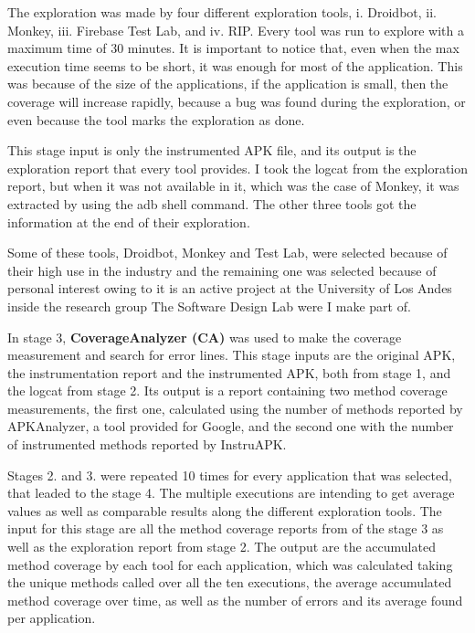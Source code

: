 The exploration was made by four different exploration tools, i. Droidbot, ii. Monkey, iii. Firebase Test Lab, and iv. RIP. Every tool was run to explore with a maximum time of 30 minutes. It is important to notice that, even when the max execution time seems to be short, it was enough for most of the application. This was because of the size of the applications, if the application is small, then the coverage will increase rapidly, because a bug was found during the exploration, or even because the tool marks the exploration as done. 

This stage input is only the instrumented APK file, and its output is the exploration report that every tool provides. I took the logcat from the exploration report, but when it was not available in it, which was the case of Monkey, it was extracted by using the adb shell command. The other three tools got the information at the end of their exploration.
 

Some of these tools, Droidbot, Monkey and Test Lab, were selected because of their high use in the industry and the remaining one was selected because of personal interest owing to it is an active project at the University of Los Andes inside the research group The Software Design Lab were I make part of. 

In stage 3, \textbf{CoverageAnalyzer (CA)} was used to make the coverage measurement and search for error lines. This stage inputs are the original APK, the instrumentation report and the instrumented APK, both from stage 1, and the logcat from stage 2. Its output is a report containing two method coverage measurements, the first one, calculated using the number of methods reported by APKAnalyzer, a tool provided for Google, and the second one with the number of instrumented methods reported by InstruAPK.


Stages 2. and 3. were repeated 10 times for every application that was selected, that leaded to the stage 4. The multiple executions are intending to get average values as well as comparable results along the different exploration tools. The input for this stage are all the method coverage reports from of the stage 3 as well as the exploration report from stage 2. The output are the accumulated method coverage by each tool for each application, which was calculated taking the unique methods called over all the ten executions, the average accumulated method coverage over time, as well as the number of errors and its average found per application.

